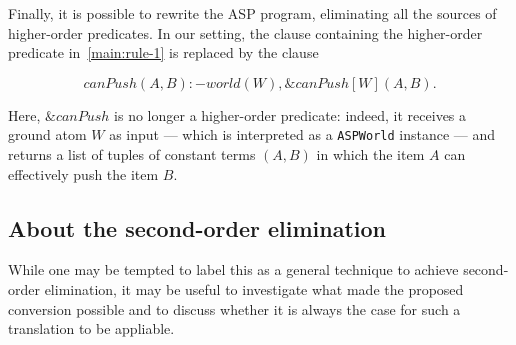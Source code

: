 Finally, it is possible to rewrite the ASP program, eliminating all the sources of higher-order predicates.
In our setting, the clause containing the higher-order predicate in~\eqref{main:rule-1} is replaced by the clause

$$ canPush(A,B) :- world(W), \&canPush[W](A,B). \label{main:rule-3} $$

Here, $\&canPush$ is no longer a higher-order predicate: indeed, it receives a ground atom $W$ as input --- which is interpreted as a \texttt{ASPWorld} instance --- and returns a list of tuples of constant terms $(A,B)$ in which the item $A$ can effectively push the item $B$.

\subsection{About the second-order elimination}

While one may be tempted to label this as a general technique to achieve second-order elimination, it may be useful to investigate what made the proposed conversion possible and to discuss whether it is always the case for such a translation to be appliable.


